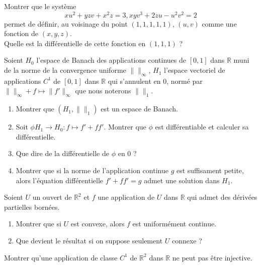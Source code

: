 \begin{exer}
Montrer que le système 
\[xu^2 + yzv + x^2 z = 3 , xyv^3 + 2zu - u^2 v^2 = 2\]
permet de définir, au voisinage du point $(1,1,1,1,1)$, $(u,v)$ comme une fonction de $(x,y,z)$.\\
Quelle est la différentielle de cette fonction en $(1,1,1)$ ?
\end{exer}

\begin{exer}
Soient $H_0$ l'espace de Banach des applications continues de $[0,1]$ dans $\mathbb{R}$ %
muni de la norme de la convergence uniforme $\| \|_{\infty}$, %
$H_1$ l'espace vectoriel de applications $C^1$ de $[0,1]$ dans $\mathbb{R}$ %
qui s'annulent en $0$, normé par $\| \|_{\infty} + f \mapsto \| f' \|_{\infty}$ que nous noterons $\| \|_1$.
\begin{enumerate}
\item Montrer que $(H_1 , \| \|_1)$ est un espace de Banach.
\item Soit $\phi H_1 \rightarrow H_0 : f \mapsto f' + ff'$. Montrer que $\phi$ est différentiable et calculer sa différentielle.
\item Que dire de la différentielle de $\phi$ en $0$ ?
\item Montrer que si la norme de l'application continue $g$ est suffisament petite, %
alors l'\'equation différentielle $f' + ff' = g$ admet une solution dans $H_1$.
\end{enumerate}
\end{exer}

\begin{exer}
Soient $U$ un ouvert de $\mathbb{R}^2$ et $f$ une application de $U$ dans $\mathbb{R}$  %
qui admet des dérivées partielles bornées.
\begin{enumerate}
\item Montrer que si $U$ est convexe, alors $f$ est uniformément continue.
\item Que devient le résultat si on suppose seulement $U$ connexe ?
\end{enumerate}
\end{exer}

\begin{exer}
Montrer qu'une application de classe $C^1$ de $\mathbb{R}^2$ dans $\mathbb{R}$ ne peut pas être injective.
\end{exer}